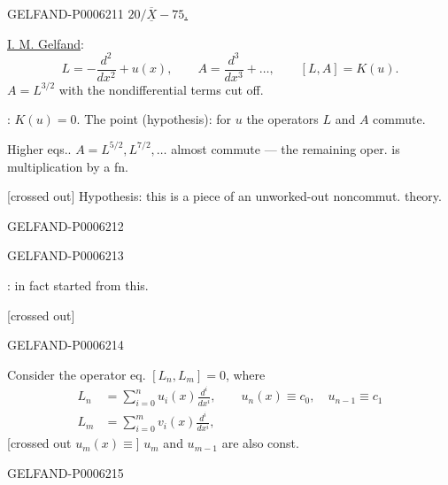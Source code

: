 \begin{GelfandAdjacentEvidence}{GELFAND-P000621}{1}
\underline{\(20/\overline{\underline X}-75\).}\qquad{}

\underline{I. M. Gelfand}:
\[
L=-\frac{d^2}{dx^2}+u(x),\qquad
A=\frac{d^3}{dx^3}+\ldots,\qquad[L,A]=K(u).
\]
\(A=L^{3/2}\) with the nondifferential terms cut off.

: \(K(u)=0\).
The point (hypothesis): for \(u\) the operators \(L\) and \(A\) commute.

Higher eqs.. \(A=L^{5/2},L^{7/2},\ldots\)\quad
almost commute — the remaining oper. is multiplication by a fn.

[crossed out] Hypothesis: this is a piece of an unworked-out noncommut. theory.
\end{GelfandAdjacentEvidence}
\begin{GelfandAdjacentEvidence}{GELFAND-P000621}{2}

\end{GelfandAdjacentEvidence}
\begin{GelfandAdjacentEvidence}{GELFAND-P000621}{3}

: in fact started from this.

[crossed out] 
\end{GelfandAdjacentEvidence}
\begin{GelfandAdjacentEvidence}{GELFAND-P000621}{4}

Consider the operator eq. \([L_n,L_m]=0\), where
\[
\begin{aligned}
L_n&=\sum_{i=0}^{n}u_i(x)\frac{d^i}{dx^i},\qquad u_n(x)\equiv c_0,\quad u_{n-1}\equiv c_1\\
L_m&=\sum_{i=0}^{m}v_i(x)\frac{d^i}{dx^i},
\end{aligned}
\]
[crossed out \sout{\(u_m(x)\equiv\)}] \(u_m\) and \(u_{m-1}\) are also const.
\end{GelfandAdjacentEvidence}
\begin{GelfandAdjacentEvidence}{GELFAND-P000621}{5}

\end{GelfandAdjacentEvidence}
